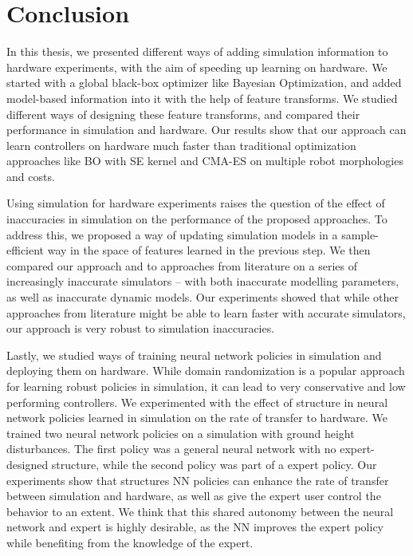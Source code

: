 \chapter{Conclusion}
\label{chap:conclusions}

In this thesis, we presented different ways of adding simulation information to hardware experiments, with the aim of speeding up learning on hardware. We started with a global black-box optimizer like Bayesian Optimization, and added model-based information into it with the help of feature transforms. We studied different ways of designing these feature transforms, and compared their performance in simulation and hardware. Our results show that our approach can learn controllers on hardware much faster than traditional optimization approaches like BO with SE kernel and CMA-ES on multiple robot morphologies and costs. 

Using simulation for hardware experiments raises the question of the effect of inaccuracies in simulation on the performance of the proposed approaches. To address this, we proposed a way of updating simulation models in a sample-efficient way in the space of features learned in the previous step. We then compared our approach and to approaches from literature on a series of increasingly inaccurate simulators -- with both inaccurate modelling parameters, as well as inaccurate dynamic models. Our experiments showed that while other approaches from literature might be able to learn faster with accurate simulators, our approach is very robust to simulation inaccuracies.

Lastly, we studied ways of training neural network policies in simulation and deploying them on hardware. While domain randomization is a popular approach for learning robust policies in simulation, it can lead to very conservative and low performing controllers. We experimented with the effect of structure in neural network policies learned in simulation on the rate of transfer to hardware. We trained two neural network policies on a simulation with ground height disturbances. The first policy was a general neural network with no expert-designed structure, while the second policy was part of a expert policy. Our experiments show that structures NN policies can enhance the rate of transfer between simulation and hardware, as well as give the expert user control the behavior to an extent. We think that this shared autonomy between the neural network and expert is highly desirable, as the NN improves the expert policy while benefiting from the knowledge of the expert.

